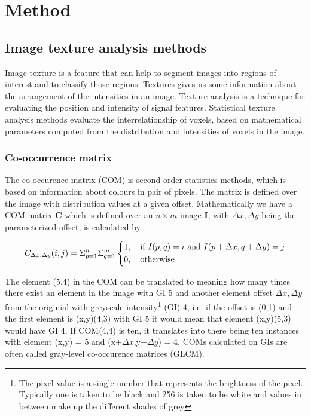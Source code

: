 \chapter{Method}


\section{Image texture analysis methods}

Image texture is a feature that can help to segment images into regions of interest and to classify those regions. Textures gives us some information about the arrangement of the intensities in an image. Texture analysis is a technique for evaluating the position and intensity of signal features\cite{Castellano}. Statistical texture analysis methods evaluate the interrelationship of voxels, based on mathematical parameters computed from the distribution and intensities of voxels in the image.

\subsection{Co-occurrence matrix}

The co-occurence matrix (COM) is second-order statistics methods, which is based on information about colours in pair of pixels. The matrix is defined over the image with distribution values at a given offset. Mathematically we have a COM matrix \textbf{C} which is defined over an $n \times m$ image \textbf{I}, with $\Delta x, \Delta y$ being the parameterized offset, is calculated by \cite{albregtsen2008statistical}

\[
C_{\Delta x, \Delta y}(i, j) = \Sigma_{p=1}^n\Sigma_{q=1}^m
\begin{dcases}
  1, \quad \text{if } I(p,q)=i \text{ and } I(p+\Delta x, q+ \Delta y) =j \\
  0, \quad \text{otherwise}
\end{dcases}
\]

The element (5,4) in the COM can be translated to meaning how many times there exist an element in the image with GI  5 and another element offset $\Delta x, \Delta y$ from the originial with greyscale intensity\footnote{The pixel value is a single number that represents the brightness of the pixel. Typically one is taken to be black and 256 is taken to be white and values in between make up the different shades of grey} (GI) 4, i.e. if the offset is (0,1) and the first element is (x,y)(4,3) with GI 5 it would mean that element (x,y)(5,3) would have GI 4. If COM(4,4) is ten, it translates into there being ten instances with element (x,y) = 5 and (x+$\Delta x$,y+$\Delta y$) = 4.
COMs calculated on GIs are often called gray-level co-occurence matrices (GLCM). 

